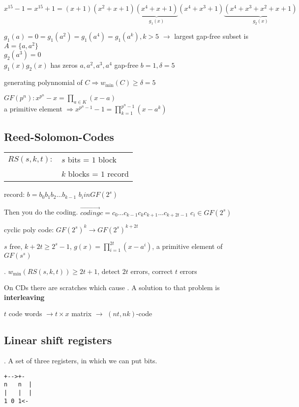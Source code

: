 $x^{15}-1 = x^{15}+1 = (x+1)(x^2+x+1)\underbrace{(x^4+x+1)}_{g_1(x)}(x^4+x^3+1)\underbrace{(x^4+x^3+x^2+x+1)}_{g_2(x)}$

$g_1(a)=0= g_1(a^2)=g_1(a^4) = g_1(a^k), k>5$ $\to$ largest gap-free subset is $A=\{a,a^2\}$\\
$g_2(a^3)=0$ \\
$g_1(x)g_2(x)$ has zeros $a,a^2,a^3,a^4$ gap-free $b=1, \delta=5$

generating polynnomial of $C \Rightarrow w_{\min}(C) \geq \delta = 5$

$GF(p^n): x^{p^n} -x = \prod_{a \in K}(x-a)$ \\
a primitive element $\Rightarrow x^{p^n-1}-1 = \prod_{k=1}^{p^n-1}(x-a^k)$

\subsection{Reed-Solomon-Codes}

\begin{tabular}{ll}
  $RS(s,k,t):$ &$s$ bits = $1$ block\\
    & $k$ blocks = $1$ record\\
\end{tabular}

record: $b= b_0b_1b_2 \ldots b_{k-1}$ \quad $b_i in GF(2^s)$

Then you do the coding. $\stackrel{\to}{coding} c= c_0\ldots c_{k-1}c_{k}c_{k+1}\ldots c_{k+2t-1}$ \quad $c_i \in GF(2^s)$

cyclic poly code: $GF(2^s)^k \to GF(2^s)^{k+2t}$

$s$ free, $k+2t \geq 2^s-1$, $g(x) = \prod_{i=1}^{2t} (x-a^i)$, a primitive element of $GF(s^s)$

\Theorem.
$w_{\min}(RS(s,k,t)) \geq 2t+1$, detect $2t$ errors, correct $t$ errors

On CDs there are scratches which cause . A solution to that problem is \textbf{interleaving}

$t$ code words $\to t \times x$ matrix $\to$ $(nt,nk)$-code

\subsection{Linear shift registers}
\Example.
A set of three registers, in which we can put bits. 


\begin{verbatim}
+-->+-
n   n  |
|   |  |
1 0 1<-
\end{verbatim}

